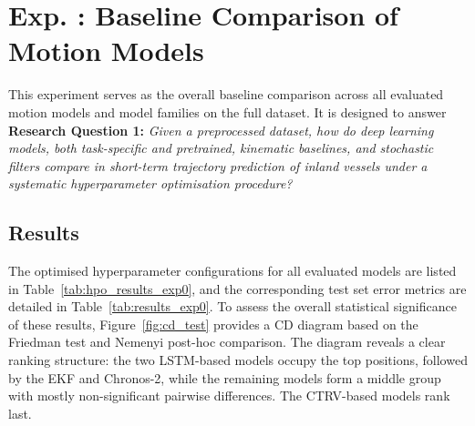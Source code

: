 \section[Exp. \Romannum{1}: Motion Model Comparison]{Exp. : Baseline Comparison of Motion Models} 

This experiment serves as the overall baseline comparison across all evaluated motion models and model families on the full dataset. 
It is designed to answer \textbf{Research Question 1:} \textit{Given a preprocessed dataset, how do deep learning models, both task-specific and pretrained, kinematic baselines, and stochastic filters compare in short-term trajectory prediction of inland vessels under a systematic hyperparameter optimisation procedure?}

\subsection{Results}

The optimised hyperparameter configurations for all evaluated models are listed in Table~\ref{tab:hpo_results_exp0}, and the corresponding test set error metrics are detailed in Table~\ref{tab:results_exp0}.
To assess the overall statistical significance of these results, Figure~\ref{fig:cd_test} provides a \ac{CD} diagram based on the Friedman test and Nemenyi post-hoc comparison.
The diagram reveals a clear ranking structure: the two LSTM-based models occupy the top positions, followed by the EKF and Chronos-2, while the remaining models form a middle group with mostly non-significant pairwise differences.
The CTRV-based models rank last.


